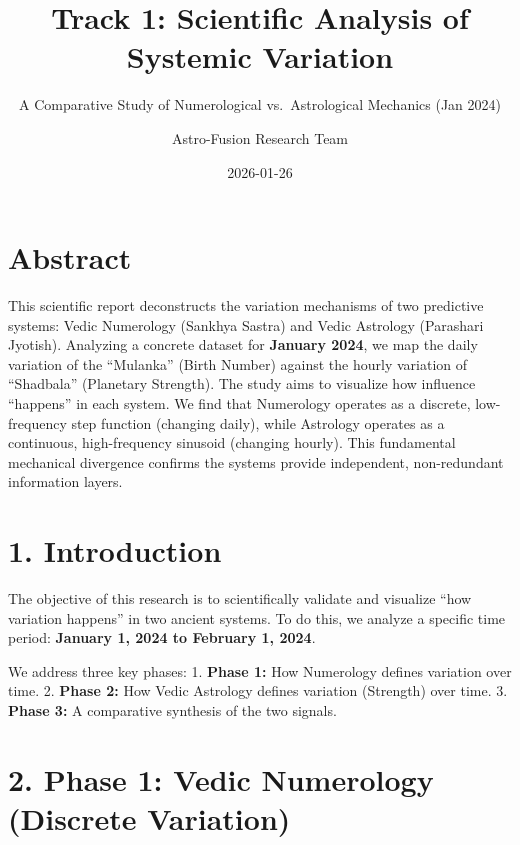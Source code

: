 \documentclass[
  american,
  11pt,
  oneside,
  openany]{scrbook}
\title{Track 1: Scientific Analysis of Systemic Variation}
\subtitle{A Comparative Study of Numerological vs.~Astrological
Mechanics (Jan 2024)}
\author{Astro-Fusion Research Team}
\date{2026-01-26}
\begin{document}
\frontmatter
\maketitle




\mainmatter
\chapter{Abstract}\label{abstract}

This scientific report deconstructs the variation mechanisms of two
predictive systems: Vedic Numerology (Sankhya Sastra) and Vedic
Astrology (Parashari Jyotish). Analyzing a concrete dataset for
\textbf{January 2024}, we map the daily variation of the ``Mulanka''
(Birth Number) against the hourly variation of ``Shadbala'' (Planetary
Strength). The study aims to visualize how influence ``happens'' in each
system. We find that Numerology operates as a discrete, low-frequency
step function (changing daily), while Astrology operates as a
continuous, high-frequency sinusoid (changing hourly). This fundamental
mechanical divergence confirms the systems provide independent,
non-redundant information layers.

\chapter{1. Introduction}\label{introduction}

The objective of this research is to scientifically validate and
visualize ``how variation happens'' in two ancient systems. To do this,
we analyze a specific time period: \textbf{January 1, 2024 to February
1, 2024}.

We address three key phases: 1. \textbf{Phase 1:} How Numerology defines
variation over time. 2. \textbf{Phase 2:} How Vedic Astrology defines
variation (Strength) over time. 3. \textbf{Phase 3:} A comparative
synthesis of the two signals.

\chapter{2. Phase 1: Vedic Numerology (Discrete
Variation)}\label{phase-1-vedic-numerology-discrete-variation}
\end{document}
